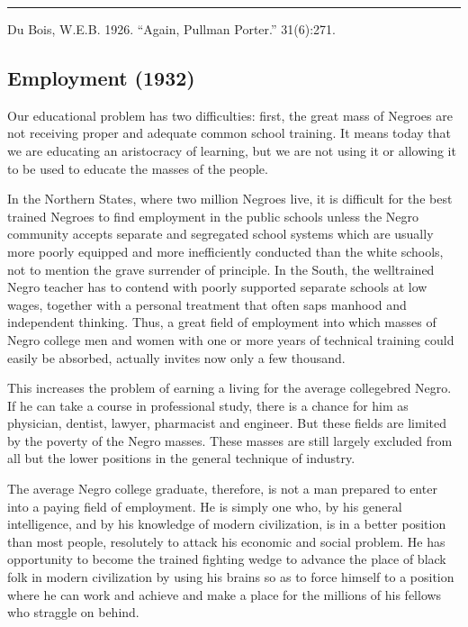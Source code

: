 \documentclass[letterpaper,10pt,english]{jupyterBook}
\begin{document}
\bigskip\hrule\bigskip


\sphinxAtStartPar
{} Du Bois, W.E.B. 1926. “Again, Pullman Porter.”  31(6):271.


\subsection{Employment (1932)}
\label{\detokenize{Volumes/39/09/employment:employment-1932}}\label{\detokenize{Volumes/39/09/employment::doc}}
\sphinxAtStartPar
Our educational problem has two difficulties: first, the great mass of Negroes are not receiving proper and adequate common school training. It means today that we are educating an aristocracy of learning, but we are not using it or allowing it to be used to educate the masses of the people.

\sphinxAtStartPar
In the Northern States, where two million Negroes live, it is difficult for the best trained Negroes to find employment in the public schools unless the Negro community accepts separate and segregated school systems which are usually more poorly equipped and more inefficiently conducted than the white schools, not to mention the grave surrender of principle. In the South, the well\sphinxhyphen{}trained Negro teacher has to contend with poorly supported separate schools at low wages, together with a personal treatment that often saps manhood and independent thinking. Thus, a great field of employment into which masses of Negro college men and women with one or more years of technical training could easily be absorbed, actually invites now only a few thousand.

\sphinxAtStartPar
This increases the problem of earning a living for the average college\sphinxhyphen{}bred Negro. If he can take a course in professional study, there is a chance for him as physician, dentist, lawyer, pharmacist and engineer. But these fields are limited by the poverty of the Negro masses. These masses are still largely excluded from all but the lower positions in the general technique of industry.

\sphinxAtStartPar
The average Negro college graduate, therefore, is not a man prepared to enter into a paying field of employment. He is simply one who, by his general intelligence, and by his knowledge of modern civilization, is in a better position than most people, resolutely to attack his economic and social problem. He has opportunity to become the trained fighting wedge to advance the place of black folk in modern civilization by using his brains so as to force himself to a position where he can work and achieve and make a place for the millions of his fellows who straggle on behind.
\end{document}
